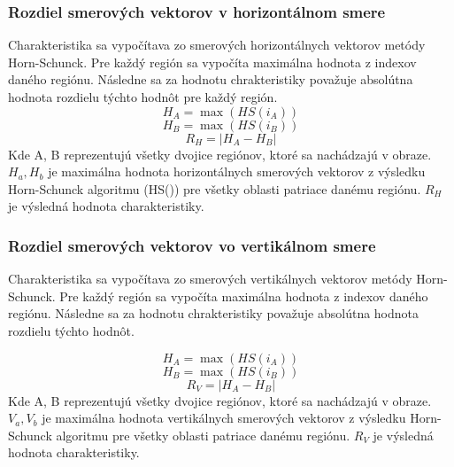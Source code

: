 \subsubsection{Rozdiel smerových vektorov v horizontálnom smere}
Charakteristika sa vypočítava zo smerových horizontálnych vektorov metódy Horn-Schunck.
Pre každý región sa vypočíta maximálna hodnota z indexov daného regiónu.
Následne sa za hodnotu chrakteristiky považuje absolútna hodnota rozdielu týchto hodnôt pre každý región.
\begin{equation}
  H_A = \max(HS(i_A))
\end{equation}
\begin{equation}
  H_B = \max(HS(i_B))
\end{equation}
\begin{equation}
  R_{H} = \left|H_A-H_B\right|
\end{equation}
Kde A, B reprezentujú všetky dvojice regiónov, ktoré sa nachádzajú v obraze.
\begin{math}H_a, H_b\end{math} je maximálna hodnota horizontálnych smerových vektorov z výsledku Horn-Schunck algoritmu (HS()) pre všetky oblasti patriace danému regiónu.
\begin{math}R_{H}\end{math} je výsledná hodnota charakteristiky.

\subsubsection{Rozdiel smerových vektorov vo vertikálnom smere}
Charakteristika sa vypočítava zo smerových vertikálnych vektorov metódy Horn-Schunck.
Pre každý región sa vypočíta maximálna hodnota z indexov daného regiónu.
Následne sa za hodnotu chrakteristiky považuje absolútna hodnota rozdielu týchto hodnôt.

\begin{equation}
  H_A = \max(HS(i_A))
\end{equation}
\begin{equation}
  H_B = \max(HS(i_B))
\end{equation}
\begin{equation}
  R_{V} = \left|H_A-H_B\right|
\end{equation}
Kde A, B reprezentujú všetky dvojice regiónov, ktoré sa nachádzajú v obraze.
\begin{math}V_a, V_b\end{math} je maximálna hodnota vertikálnych smerových vektorov z výsledku Horn-Schunck algoritmu pre všetky oblasti patriace danému regiónu.
\begin{math}R_{V}\end{math} je výsledná hodnota charakteristiky.

